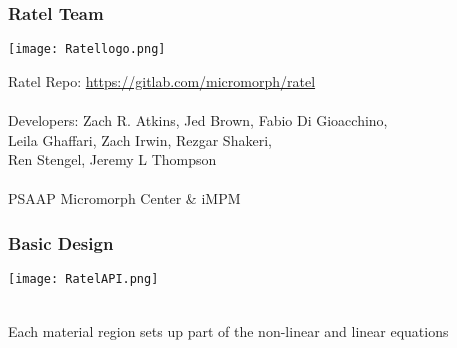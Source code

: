 \documentclass{beamer}
\begin{document}
\begin{frame}
\frametitle{Ratel Team}

\begin{center}
\texttt{[image: Ratellogo.png]}
\end{center}

{\flushleft

Ratel Repo: \href{https://gitlab.com/micromorph/ratel}{https://gitlab.com/micromorph/ratel}\\

~\\
Developers: Zach R. Atkins, Jed Brown, Fabio Di Gioacchino,\\
\hspace{19mm} Leila Ghaffari, Zach Irwin, Rezgar Shakeri,\\
\hspace{19mm} Ren Stengel, Jeremy L Thompson\\

~\\

PSAAP Micromorph Center \& iMPM

}

\end{frame}


\begin{frame}
\begin{center}
\frametitle{Basic Design}

\texttt{[image: RatelAPI.png]}

~\\

Each material region sets up part of the non-linear and linear equations\\

\end{center}
\end{frame}

\end{document}
